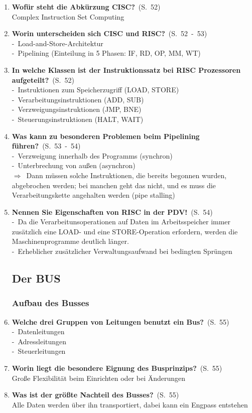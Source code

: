 \documentclass[a4paper,12pt]{article}
\newcommand{\question}[3]{\pagebreak[3]\item {\textbf{#1?}}\ (S.\ #2)#3}
\newcommand{\statement}[3]{\pagebreak[3]\item {\textbf{#1!}}\ (S.\ #2)#3}
\newcommand{\catchword}[1]{\\-\ #1}
\newcommand{\normaltext}[1]{\\#1}
\newcommand{\result}[1]{\\$\Rightarrow$\ #1}
\newcommand{\page}[1]{#1}
\newcommand{\pages}[2]{#1\ -\ #2}
\begin{document}
\begin{enumerate}
  \question{Wofür steht die Abkürzung CISC}{\page{52}}
  {
    \normaltext{Complex Instruction Set Computing}
  }

  \question{Worin unterscheiden sich CISC und RISC}{\pages{52}{53}}
  {
    \catchword{Load-and-Store-Architektur}
    \catchword{Pipelining (Einteilung in 5 Phasen: IF, RD, OP, MM, WT)}
  }

  \question{In welche Klassen ist der Instruktionssatz bei RISC Prozessoren aufgeteilt}{\page{52}}
  {
    \catchword{Instruktionen zum Speicherzugriff (LOAD, STORE)}
    \catchword{Verarbeitungsinstruktionen (ADD, SUB)}
    \catchword{Verzweigungsinstruktionen (JMP, BNE)}
    \catchword{Steuerungsinstruktionen (HALT, WAIT)}
  }

  \question{Was kann zu besonderen Problemen beim Pipelining führen}{\pages{53}{54}}
  {
    \catchword{Verzweigung innerhalb des Programms (synchron)}
    \catchword{Unterbrechung von außen (asynchron)}
    \result{Dann müssen solche Instruktionen, die bereits begonnen wurden, abgebrochen
            werden; bei manchen geht das nicht, und es muss die Verarbeitungskette angehalten
            werden (pipe stalling)}
  }

  \statement{Nennen Sie Eigenschaften von RISC in der PDV}{\page{54}}
  {
    \catchword{Da die Verarbeitunsoperationen auf Daten im Arbeitsspeicher immer zusätzlich
               eine LOAD- und eine STORE-Operation erfordern, werden die Maschinenprogramme
               deutlich länger.}
    \catchword{Erheblicher zusätzlicher Verwaltungsaufwand bei bedingten Sprüngen}
  }

  \subsection{Der BUS}

  \subsubsection{Aufbau des Busses}

  \question{Welche drei Gruppen von Leitungen benutzt ein Bus}{\page{55}}
  {
    \catchword{Datenleitungen}
    \catchword{Adressleitungen}
    \catchword{Steuerleitungen}
  }

  \question{Worin liegt die besondere Eignung des Busprinzips}{\page{55}}
  {
    \normaltext{Große Flexibilität beim Einrichten oder bei Änderungen}
  }

  \question{Was ist der größte Nachteil des Busses}{\page{55}}
  {
    \normaltext{Alle Daten werden über ihn transportiert, dabei kann ein Engpass entstehen}
  }


\end{enumerate}
\end{document}
